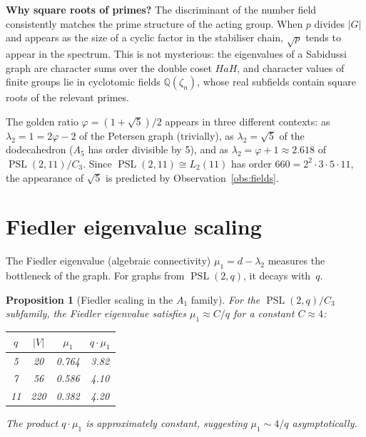 \documentclass[11pt,a4paper]{article}
\theoremstyle{plain}
\newtheorem{proposition}[theorem]{Proposition}
\theoremstyle{definition}
\theoremstyle{remark}
\newcommand{\Q}{\mathbb{Q}}
\newcommand{\PSL}{\operatorname{PSL}}
\begin{document}
\begin{tcolorbox}[breakable, colback=yellow!10, colframe=yellow!10,
  boxrule=0pt, sharp corners]
\textbf{Why square roots of primes?}
The discriminant of the number field consistently matches the prime
structure of the acting group. When $p$ divides $|G|$ and appears as
the size of a cyclic factor in the stabiliser chain, $\sqrt{p}$ tends
to appear in the spectrum. This is not mysterious: the eigenvalues of a
Sabidussi graph are character sums over the double coset $HaH$, and
character values of finite groups lie in cyclotomic fields
$\Q(\zeta_n)$, whose real subfields contain square roots of the
relevant primes.

The golden ratio $\varphi = (1 + \sqrt{5})/2$ appears in three different
contexts: as $\lambda_2 = 1 = 2\varphi - 2$ of the Petersen graph
(trivially), as $\lambda_2 = \sqrt{5}$ of the dodecahedron ($A_5$ has
order divisible by 5), and as $\lambda_2 = \varphi + 1 \approx 2.618$
of $\PSL(2,11)/C_3$. Since $\PSL(2,11) \cong L_2(11)$ has order
$660 = 2^2 \cdot 3 \cdot 5 \cdot 11$, the appearance of $\sqrt{5}$ is
predicted by Observation~\ref{obs:fields}.
\end{tcolorbox}


\section{Fiedler eigenvalue scaling}

The Fiedler eigenvalue (algebraic connectivity) $\mu_1 = d - \lambda_2$
measures the bottleneck of the graph. For graphs from $\PSL(2,q)$, it
decays with~$q$.

\begin{tcolorbox}[breakable, colback=black!5, colframe=black!5,
  boxrule=0pt, sharp corners]
\begin{proposition}[Fiedler scaling in the $A_1$ family]
\label{prop:fiedler-A1}
For the $\PSL(2,q)/C_3$ subfamily, the Fiedler eigenvalue satisfies
$\mu_1 \approx C/q$ for a constant $C \approx 4$:
\begin{center}
\begin{tabular}{@{}c c c c@{}}
\toprule
$q$ & $|V|$ & $\mu_1$ & $q \cdot \mu_1$ \\
\midrule
5  &  20 & 0.764 & 3.82 \\
7  &  56 & 0.586 & 4.10 \\
11 & 220 & 0.382 & 4.20 \\
\bottomrule
\end{tabular}
\end{center}
The product $q \cdot \mu_1$ is approximately constant, suggesting
$\mu_1 \sim 4/q$ asymptotically.
\end{proposition}
\end{tcolorbox}
\end{document}
